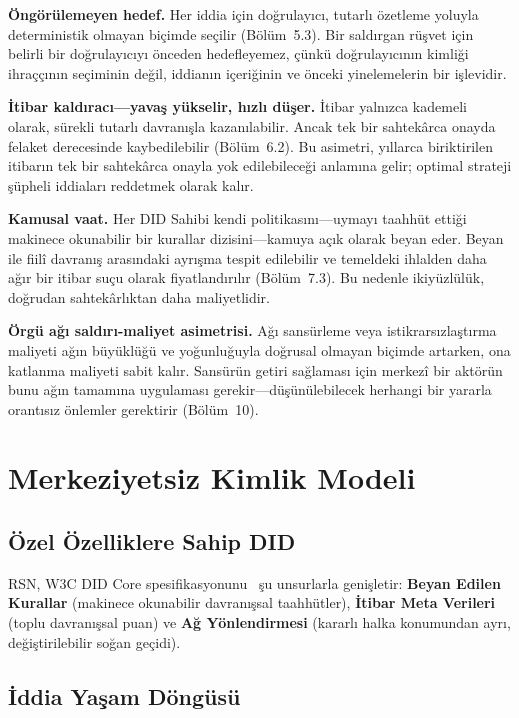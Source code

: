 \documentclass[11pt,a4paper,twocolumn]{article}
\begin{document}
\textbf{Öngörülemeyen hedef.} Her iddia için doğrulayıcı, tutarlı özetleme yoluyla deterministik olmayan biçimde seçilir (Bölüm~5.3). Bir saldırgan rüşvet için belirli bir doğrulayıcıyı önceden hedefleyemez, çünkü doğrulayıcının kimliği ihraççının seçiminin değil, iddianın içeriğinin ve önceki yinelemelerin bir işlevidir.

\textbf{İtibar kaldıracı---yavaş yükselir, hızlı düşer.} İtibar yalnızca kademeli olarak, sürekli tutarlı davranışla kazanılabilir. Ancak tek bir sahtekârca onayda felaket derecesinde kaybedilebilir (Bölüm~6.2). Bu asimetri, yıllarca biriktirilen itibarın tek bir sahtekârca onayla yok edilebileceği anlamına gelir; optimal strateji şüpheli iddiaları reddetmek olarak kalır.

\textbf{Kamusal vaat.} Her DID Sahibi kendi politikasını---uymayı taahhüt ettiği makinece okunabilir bir kurallar dizisini---kamuya açık olarak beyan eder. Beyan ile fiilî davranış arasındaki ayrışma tespit edilebilir ve temeldeki ihlalden daha ağır bir itibar suçu olarak fiyatlandırılır (Bölüm~7.3). Bu nedenle ikiyüzlülük, doğrudan sahtekârlıktan daha maliyetlidir.

\textbf{Örgü ağı saldırı-maliyet asimetrisi.} Ağı sansürleme veya istikrarsızlaştırma maliyeti ağın büyüklüğü ve yoğunluğuyla doğrusal olmayan biçimde artarken, ona katlanma maliyeti sabit kalır. Sansürün getiri sağlaması için merkezî bir aktörün bunu ağın tamamına uygulaması gerekir---düşünülebilecek herhangi bir yararla orantısız önlemler gerektirir (Bölüm~10).

\section{Merkeziyetsiz Kimlik Modeli}

\subsection{Özel Özelliklere Sahip DID}

RSN, W3C DID Core spesifikasyonunu~\cite{did2022} şu unsurlarla genişletir: \textbf{Beyan Edilen Kurallar} (makinece okunabilir davranışsal taahhütler), \textbf{İtibar Meta Verileri} (toplu davranışsal puan) ve \textbf{Ağ Yönlendirmesi} (kararlı halka konumundan ayrı, değiştirilebilir soğan geçidi).

\subsection{İddia Yaşam Döngüsü}
\end{document}
